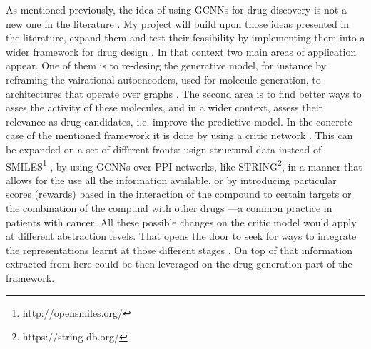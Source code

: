 \documentclass{article}
\begin{document}
As mentioned previously, the idea of using GCNNs for drug discovery is not a new one in
the literature \cite{Sun2019}. My project will build upon those ideas presented in the
literature, expand them and test their feasibility by implementing them into a wider
framework for drug design \cite{Born2019}. In that context two main areas of application
appear. One of them is to re-desing the generative model, for instance by reframing the
vairational autoencoders, used for molecule generation, to architectures that operate
over graphs \cite{Simonovsky2018,Li2018,Li2018a}. The second area is to find better ways
to asses the activity of these molecules, and in a wider context, assess their relevance
as drug candidates, i.e. improve the predictive model. In the concrete case of the
mentioned framework it is done by using a critic network \cite{Manica2019}. This can be
expanded on a set of different fronts: usign structural data instead of
SMILES\footnote{http://opensmiles.org/} \cite{Li,Do2019}, by using GCNNs over PPI
networks, like STRING\footnote{https://string-db.org/}, in a manner that allows for the
use all the information available\cite{Oskooei2019, Wang2019}, or by introducing
particular scores (rewards) based in the interaction of the compound to certain targets
\cite{YingkaiGao2018, Zhavoronkov2019} or the combination of the compund with other
drugs \cite{Zitnik2018}---a common practice in patients with cancer. All these possible changes on the critic model would apply at different abstraction
levels. That opens the door to seek for ways to integrate the representations learnt at
those different stages \cite{Ying2018, Ma2019, Huang2019}. On top of that information
extracted from here could be then leveraged on the drug generation part of the
framework.










    
\end{document}
